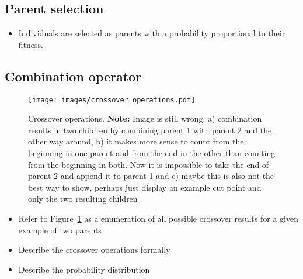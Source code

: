 \subsection{Parent selection}
\label{sec:approach_parent_selection}
\begin{itemize}
	\item Individuals are selected as parents with a probability proportional
		to their fitness.
\end{itemize}
\subsection{Combination operator}
\label{sec:approach_combination_operator}
\begin{figure}[ht!]
	\centering
	\texttt{[image: images/crossover\_operations.pdf]}
	\caption[Crossover operations]{Crossover operations. \textbf{Note:} Image
is still wrong. a) combination results in two children by combining parent 1
with parent 2 and the other way around, b) it makes more sense to count from
the beginning in one parent and from the end in the other than counting from
the beginning in both. Now it is impossible to take the end of parent 2 and
append it to parent 1 and c) maybe this is also not the best way to show,
perhaps just display an example cut point and only the two resulting children}
	\label{fig:crossover_operations}
\end{figure}
\begin{itemize}
	\item Refer to Figure~\ref{fig:crossover_operations} as a enumeration of
		all possible crossover results for a given example of two parents
	\item Describe the crossover operations formally
	\item Describe the probability distribution
\end{itemize}
